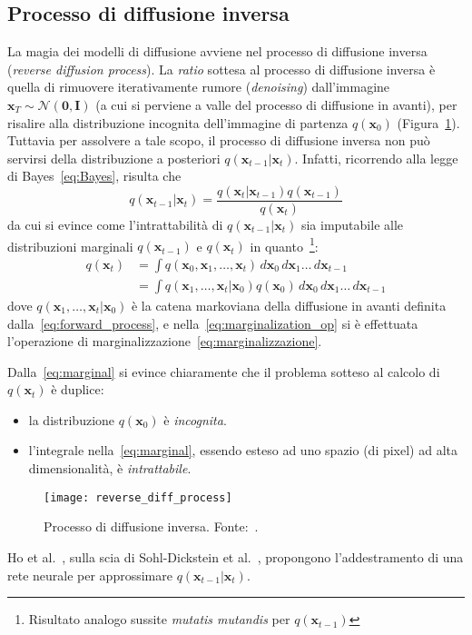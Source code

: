 \subsection{Processo di diffusione inversa}


La magia dei modelli di diffusione avviene nel processo di diffusione inversa (\emph{reverse diffusion process}). 
La \emph{ratio} sottesa al processo di diffusione inversa è quella di rimuovere iterativamente rumore
(\emph{denoising}) dall'immagine $\mathbf{x}_T\sim\mathcal{N}(\bm{0},\bm{I})$ (a cui si perviene a valle del processo di diffusione in avanti),
per risalire alla distribuzione incognita dell'immagine di partenza $q(\mathbf{x}_0)$ (Figura~\ref{fig:reverse_diff_process}).
Tuttavia per assolvere a tale scopo, il processo di diffusione inversa non può servirsi della distribuzione a posteriori
$q(\mathbf{x}_{t-1}|\mathbf{x}_t)$. Infatti, ricorrendo alla legge di Bayes~\eqref{eq:Bayes}, risulta che
\begin{equation}
    q(\mathbf{x}_{t-1}|\mathbf{x}_t)=\frac{q(\mathbf{x}_{t}|\mathbf{x}_{t-1})q(\mathbf{x}_{t-1})}{q(\mathbf{x}_t)} \label{eq:reverse_transition}
\end{equation}
da cui si evince come l'intrattabilità di $q(\mathbf{x}_{t-1}|\mathbf{x}_t)$ sia imputabile alle distribuzioni marginali $q(\mathbf{x}_{t-1})$ e $q(\mathbf{x}_t)$ 
in quanto~\footnote{Risultato analogo sussite \emph{mutatis mutandis} per $q(\mathbf{x}_{t-1})$}:
\begin{align}
    q(\mathbf{x}_t) &= \int q(\mathbf{x}_0,\mathbf{x}_1,\dots,\mathbf{x}_t)\,d\mathbf{x}_0\,d\mathbf{x}_1\dots\,d\mathbf{x}_{t-1} \label{eq:marginalization_op} \\
                    &= \int q(\mathbf{x}_1,\dots,\mathbf{x}_t|\mathbf{x}_0)q(\mathbf{x}_0) \,d\mathbf{x}_0\,d\mathbf{x}_1\dots\,d\mathbf{x}_{t-1} \label{eq:marginal}
\end{align}
dove $q(\mathbf{x}_1,\dots,\mathbf{x}_t|\mathbf{x}_0)$ è la catena markoviana della diffusione in avanti definita dalla~\eqref{eq:forward_process}, 
e nella~\eqref{eq:marginalization_op} si è effettuata l'operazione di marginalizzazione~\eqref{eq:marginalizzazione}.

Dalla~\eqref{eq:marginal} si evince chiaramente che il problema sotteso al calcolo di $q(\mathbf{x}_t)$ è duplice:
\begin{itemize}
\item la distribuzione $q(\mathbf{x}_0)$ è \emph{incognita}.
\item l'integrale nella~\eqref{eq:marginal}, essendo esteso ad uno spazio (di pixel) ad alta dimensionalità, è \emph{intrattabile}.
\end{itemize}
\begin{figure}
    \centering
    \texttt{[image: reverse\_diff\_process]}
    \caption{Processo di diffusione inversa. Fonte:~\cite{ho2020}.}
    \label{fig:reverse_diff_process}
\end{figure}
Ho et al.~\cite{ho2020}, sulla scia di Sohl-Dickstein et al.~\cite{sohl-dickstein2015}, propongono l'addestramento di una rete neurale
per approssimare $q(\mathbf{x}_{t-1}|\mathbf{x}_t)$.

